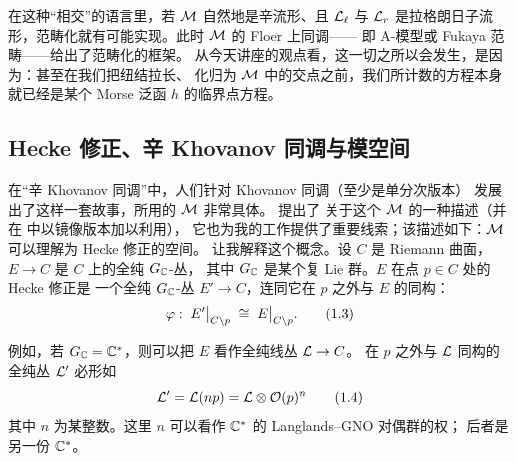 
在这种“相交”的语言里，若 $\mathcal{M}$ 自然地是辛流形、且 $\mathcal{L}_\ell$ 与 $\mathcal{L}_r$
是拉格朗日子流形，范畴化就有可能实现。此时 $\mathcal{M}$ 的 Floer 上同调——
即 A-模型或 Fukaya 范畴——给出了范畴化的框架。
从今天讲座的观点看，这一切之所以会发生，是因为：甚至在我们把纽结拉长、
化归为 $\mathcal{M}$ 中的交点之前，我们所计数的方程本身就已经是某个 Morse 泛函 $h$
的临界点方程。


\subsection{Hecke 修正、辛 Khovanov 同调与模空间}

在“辛 Khovanov 同调”中，人们针对 Khovanov 同调（至少是单分次版本）
发展出了这样一套故事，所用的 $\mathcal{M}$ 非常具体。\cite{Kamnitzer} 提出了
关于这个 $\mathcal{M}$ 的一种描述（并在 \cite{CK} 中以镜像版本加以利用），
它也为我的工作提供了重要线索；该描述如下：$\mathcal{M}$ 可以理解为 Hecke 修正的空间。
让我解释这个概念。设 $C$ 是 Riemann 曲面，$E\to C$ 是 $C$ 上的全纯 $G_{\mathbb{C}}$-丛，
其中 $G_{\mathbb{C}}$ 是某个复 Lie 群。$E$ 在点 $p\in C$ 处的 Hecke 修正是
一个全纯 $G_{\mathbb{C}}$-丛 $E'\to C$，连同它在 $p$ 之外与 $E$ 的同构：
\begin{equation}\stepcounter{equation}
  \varphi:\; E'\big|_{C\setminus p}\;\cong\; E\big|_{C\setminus p}.
  \tag{1.3}\label{eq:1.3}
\end{equation}


例如，若 $G_{\mathbb{C}}=\mathbb{C}^{*}$，则可以把 $E$ 看作全纯线丛 $\mathcal{L}\to C$。
在 $p$ 之外与 $\mathcal{L}$ 同构的全纯丛 $\mathcal{L}'$ 必形如
\begin{equation}\stepcounter{equation}
  \sL'=\sL(np)=\sL\otimes\sO(p)^{n}
  \tag{1.4}\label{eq:1.4}
\end{equation}
其中 $n$ 为某整数。这里 $n$ 可以看作 $\mathbb{C}^{*}$ 的 Langlands--GNO 对偶群的权；
后者是另一份 $\mathbb{C}^{*}$。

